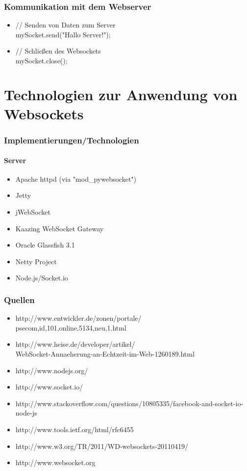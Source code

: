 \documentclass{beamer}
\begin{document}
\begin{frame}
\frametitle{Kommunikation mit dem Webserver}
\begin{itemize}
\item // Senden von Daten zum Server \\
mySocket.send("Hallo Server!"); \\
\item // Schließen des Websockets \\
mySocket.close(); \\
\end{itemize}
\end{frame}

\section{Technologien zur Anwendung von Websockets}
\begin{frame}
\frametitle{Implementierungen/Technologien}
\framesubtitle{Server}
\begin{itemize}
\item Apache httpd (via "mod\_pywebsocket")
\item Jetty
\item jWebSocket
\item Kaazing WebSocket Gateway
\item Oracle Glassfish 3.1
\item Netty Project
\item Node.js/Socket.io
\end{itemize}
\end{frame}

\begin{appendix}
\begin{frame}
\frametitle{Quellen}
\begin{itemize}
\item http://www.entwickler.de/zonen/portale/\\psecom,id,101,online,5134,neu,1.html
\item http://www.heise.de/developer/artikel/\\WebSocket-Annaeherung-an-Echtzeit-im-Web-1260189.html
\item http://www.nodejs.org/
\item http://www.socket.io/
\item http://www.stackoverflow.com/questions/10805335/facebook-and-socket-io-node-js
\item http://www.tools.ietf.org/html/rfc6455
\item http://www.w3.org/TR/2011/WD-websockets-20110419/
\item http://www.websocket.org
\end{itemize}
\end{frame}
\end{appendix}
\end{document}
